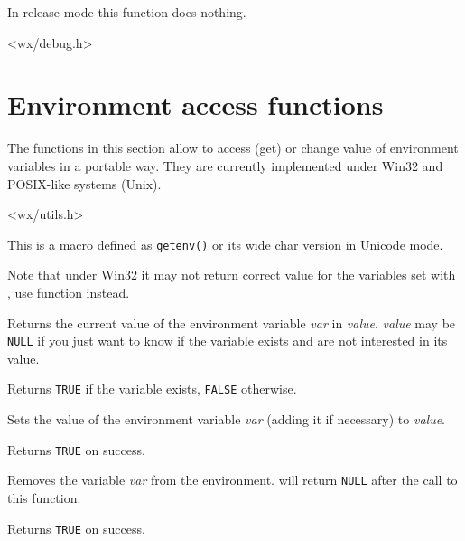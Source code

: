 In release mode this function does nothing.


<wx/debug.h>

\section{Environment access functions}\label{environfunctions}

The functions in this section allow to access (get) or change value of
environment variables in a portable way. They are currently implemented under
Win32 and POSIX-like systems (Unix).



<wx/utils.h>

\label{wxgetenvmacro}


This is a macro defined as {\tt getenv()} or its wide char version in Unicode
mode.

Note that under Win32 it may not return correct value for the variables set
with , use  function
instead.

\label{wxgetenv}


Returns the current value of the environment variable {\it var} in {\it value}.
{\it value} may be {\tt NULL} if you just want to know if the variable exists
and are not interested in its value.

Returns {\tt TRUE} if the variable exists, {\tt FALSE} otherwise.

\label{wxsetenv}


Sets the value of the environment variable {\it var} (adding it if necessary)
to {\it value}.

Returns {\tt TRUE} on success.

\label{wxunsetenv}


Removes the variable {\it var} from the environment.
 will return {\tt NULL} after the call to this
function.

Returns {\tt TRUE} on success.

